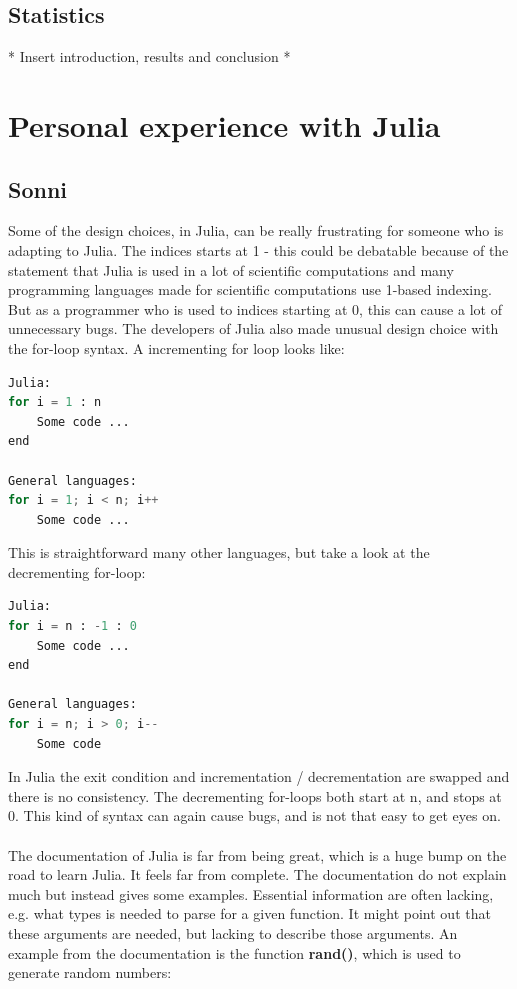 \documentclass[a4paper, 11pt, titlepage]{article}
\begin{document}
\subsection{Statistics}
* Insert introduction, results and conclusion *
\section{Personal experience with Julia}
\subsection{Sonni}
Some of the design choices, in Julia, can be really frustrating for someone who is adapting to Julia. The indices starts at 1 - this could be debatable because of the statement that Julia is used in a lot of scientific computations and many programming languages made for scientific computations use 1-based indexing. But as a programmer who is used to indices starting at 0, this can cause a lot of unnecessary bugs. The developers of Julia also made unusual design choice with the for-loop syntax. A incrementing for loop looks like:
\begin{lstlisting}[language=python]
Julia:
for i = 1 : n
	Some code ...
end

General languages:
for i = 1; i < n; i++
	Some code ...
\end{lstlisting}
This is straightforward many other languages, but take a look at the decrementing for-loop:
\begin{lstlisting}[language=python]
Julia:
for i = n : -1 : 0
	Some code ...
end

General languages:
for i = n; i > 0; i--
	Some code
\end{lstlisting}
In Julia the exit condition and incrementation / decrementation are swapped and there is no consistency. The decrementing for-loops both start at n, and stops at 0. This kind of syntax can again cause bugs, and is not that easy to get eyes on.\\
\\
The documentation of Julia is far from being great, which is a huge bump on the road to learn Julia. It feels far from complete. The documentation do not explain much but instead gives some examples. Essential information are often lacking, e.g. what types is needed to parse for a given function. It might point out that these arguments are needed, but lacking to describe those arguments. An example from the documentation is the function \textbf{rand()}, which is used to generate random numbers:
\end{document}
